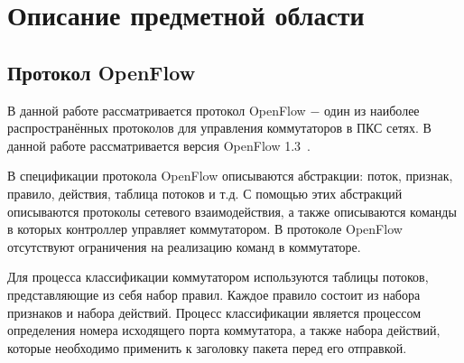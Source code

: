 \documentclass[oneside,final,12pt]{extarticle}
\begin{document}
    \section{Описание предметной области}
    \label{sect:domain}
        \subsection{Протокол OpenFlow}
            \label{sect:openflow}
            В данной работе рассматривается протокол OpenFlow $-$ один из наиболее распространённых протоколов для управления коммутаторов в ПКС сетях.
            В данной работе рассматривается версия OpenFlow 1.3~\cite{openflow}. 

            В спецификации протокола OpenFlow описываются абстракции: поток, признак, правило, действия, таблица потоков и т.д. С помощью этих абстракций описываются
            протоколы сетевого взаимодействия, а также описываются команды в которых контроллер управляет коммутатором. В протоколе OpenFlow отсутствуют ограничения
            на реализацию команд в коммутаторе.

            Для процесса классификации коммутатором используются таблицы потоков, представляющие из себя набор правил. Каждое правило состоит из набора признаков
            и набора действий. Процесс классификации является процессом определения номера исходящего порта коммутатора, а также набора действий, которые необходимо 
            применить к заголовку пакета перед его отправкой.
\end{document}
